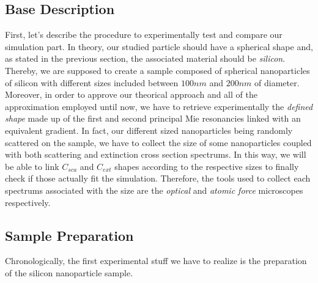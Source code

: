 \documentclass{article}
\numberwithin{equation}{section}
\begin{document}
\subsection{Base Description}

First, let's describe the procedure to experimentally test and compare our simulation part. In theory, our studied particle should have a spherical shape and, as stated in the previous section, the associated material should be \textit{silicon}. Thereby, we are supposed to create a sample composed of spherical nanoparticles of silicon with different sizes included between $100nm$ and $200nm$ of diameter. Moreover, in order to approve our theorical approach and all of the approximation employed until now, we have to retrieve experimentally the \textit{defined shape} made up of the first and second principal Mie resonancies linked with an equivalent gradient. In fact, our different sized nanoparticles being randomly scattered on the sample, we have to collect the size of some nanoparticles coupled with both scattering and extinction cross section spectrums. In this way, we will be able to link $C_{sca}$ and $C_{ext}$ shapes according to the respective sizes to finally check if those actually fit the simulation. Therefore, the tools used to collect each spectrums associated with the size are the \textit{optical} and \textit{atomic force} microscopes respectively.

\subsection{Sample Preparation}

Chronologically, the first experimental stuff we have to realize is the preparation of the silicon nanoparticle sample.
\end{document}
